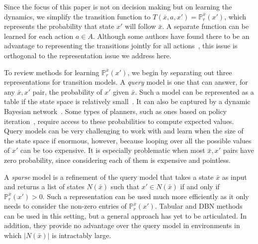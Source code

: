 \documentclass[letterpaper]{article} %
\begin{document}
Since the focus of this paper is not on decision making but on learning the dynamics, we simplify the transition function to $T(\bar{x},a,x')=\mathbb{P}^{\bar{x}}_{r}(x')$, which represents the probability that state $x'$ will follow $\bar{x}$. A separate function can be learned for each action $a\in A$. Although some authors have found there to be an advantage to representing the transitions jointly for all actions~\cite{oh15}, this issue is orthogonal to the representation issue we address here.

To review methods for learning $\mathbb{P}^{\bar{x}}_{r}(x')$, we begin by separating out three representations for transition models. A \emph{query}
model is one that can answer, for any $\bar{x},x'$ pair, the probability of $x'$ given $\bar{x}$. Such a model can be represented as a table if the state space is relatively small~\cite{kearns02}. It can also be captured by a dynamic Bayesian network~\cite{kearns99d,degris2006learning}.
Some types of planners, such as ones based on policy iteration~\cite{Puterman94}, require access to these probabilities to compute expected values. 
Query models can be very challenging to work with and learn when the size of the state space if enormous, however, because looping over all the possible values of $x'$ can be too expensive. It is especially problematic when most $\bar{x},x'$ pairs have zero probability, since considering each of them is expensive and pointless.

A \emph{sparse} model is a refinement of the query model that takes a state $\bar{x}$ as input and returns a list of states $N(\bar{x})$ such that $x' \in N(\bar{x})$ if and only if $\mathbb{P}^{\bar{x}}_{r}(x')>0$. Such a representation can be used much more efficiently as it only needs to consider the non-zero entries of $\mathbb{P}^{\bar{x}}_{r}(x')$. Tabular and DBN methods can be used in this setting, but a general approach has yet to be articulated. In addition, they provide no advantage over the query model in environments in which $|N(\bar{x})|$ is intractably large.
\end{document}
